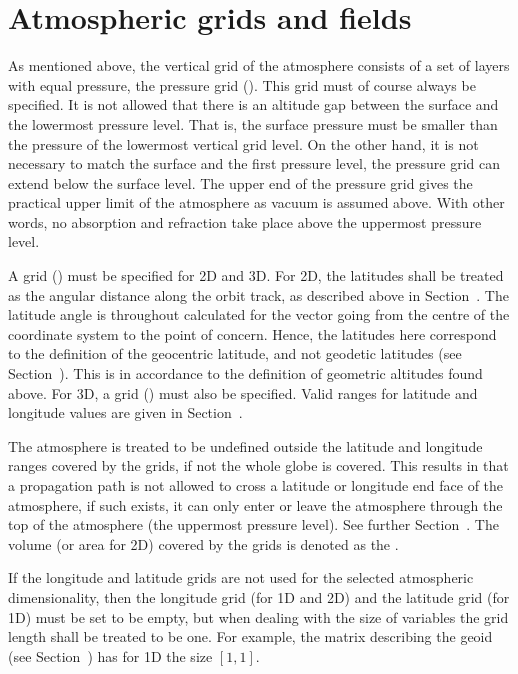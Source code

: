 


\section{Atmospheric grids and fields}

As mentioned above, the vertical grid of the atmosphere consists of a
set of layers with equal pressure, the pressure grid
().  This grid must of course always be specified.
It is not allowed that there is an altitude gap between the surface and
the lowermost pressure level.  That is, the surface pressure must be
smaller than the pressure of the lowermost vertical grid level. On
the other hand, it is not necessary to match the surface and the first
pressure level, the pressure grid can extend below the surface level.
The upper end of the pressure grid gives the practical upper limit of
the atmosphere as vacuum is assumed above. With other words, no
absorption and refraction take place above the uppermost pressure
level.

A  grid () must be specified
for 2D and 3D.  For 2D, the latitudes shall be treated as the angular
distance along the orbit track, as described above in
Section~.  The latitude angle is throughout
calculated for the vector going from the centre of the coordinate
system to the point of concern. Hence, the latitudes here correspond
to the definition of the geocentric latitude, and not geodetic
latitudes (see Section~). This is in accordance
to the definition of geometric altitudes found above.  For 3D, a
 grid () must also be specified.
Valid ranges for latitude and longitude values are given in
Section~.

The atmosphere is treated to be undefined outside the latitude and
longitude ranges covered by the grids, if not the whole globe is
covered. This results in that a propagation path is not allowed to
cross a latitude or longitude end face of the atmosphere, if such
exists, it can only enter or leave the atmosphere through the top of
the atmosphere (the uppermost pressure level). See further
Section~. The volume (or area for 2D) covered
by the grids is denoted as the .

If the longitude and latitude grids are not used for the selected
atmospheric dimensionality, then the longitude grid (for 1D and 2D)
and the latitude grid (for 1D) must be set to be empty, but when
dealing with the size of variables the grid length shall be treated to
be one. For example, the matrix describing the geoid (see
Section~) has for 1D the size $[1,1]$.


